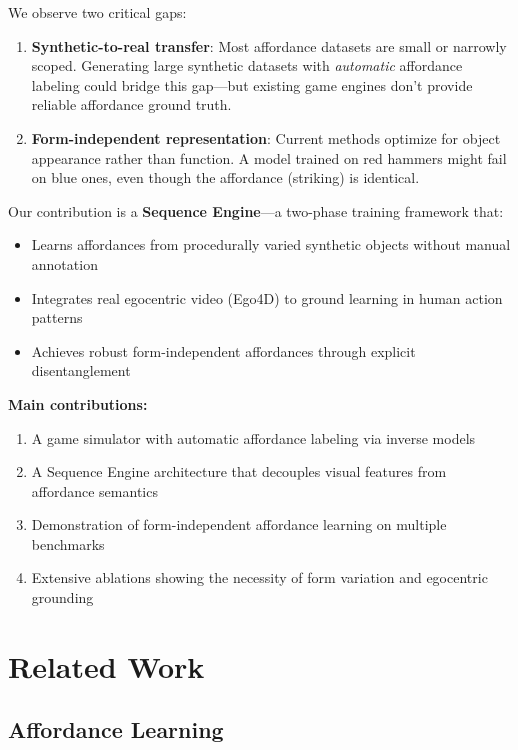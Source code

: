 \documentclass[11pt]{article}
\begin{document}
We observe two critical gaps:

\begin{enumerate}
    \item \textbf{Synthetic-to-real transfer}: Most affordance datasets are small or narrowly scoped. Generating large synthetic datasets with \textit{automatic} affordance labeling could bridge this gap—but existing game engines don't provide reliable affordance ground truth.
    
    \item \textbf{Form-independent representation}: Current methods optimize for object appearance rather than function. A model trained on red hammers might fail on blue ones, even though the affordance (striking) is identical.
\end{enumerate}

Our contribution is a \textbf{Sequence Engine}—a two-phase training framework that:
\begin{itemize}
    \item Learns affordances from procedurally varied synthetic objects without manual annotation
    \item Integrates real egocentric video (Ego4D) to ground learning in human action patterns
    \item Achieves robust form-independent affordances through explicit disentanglement
\end{itemize}

\textbf{Main contributions:}
\begin{enumerate}
    \item A game simulator with automatic affordance labeling via inverse models
    \item A Sequence Engine architecture that decouples visual features from affordance semantics
    \item Demonstration of form-independent affordance learning on multiple benchmarks
    \item Extensive ablations showing the necessity of form variation and egocentric grounding
\end{enumerate}

\section{Related Work}

\subsection{Affordance Learning}
\end{document}

